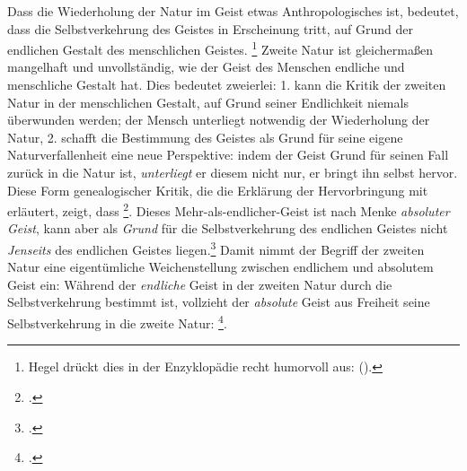 \documentclass[12pt, a4paper, openany]{report}
\begin{document}
Dass die Wiederholung der Natur im Geist etwas Anthropologisches ist, bedeutet, dass die Selbstverkehrung des Geistes in Erscheinung tritt, auf Grund der endlichen Gestalt des menschlichen Geistes.%
\footnote{
    Hegel drückt dies in der Enzyklopädie recht humorvoll aus:  (\cite[][§ 410 A, S. 186]{hegel_enzyklopädie_1969}).
}
Zweite Natur ist gleichermaßen mangelhaft und unvollständig, wie der Geist des Menschen endliche und menschliche Gestalt hat.
Dies bedeutet zweierlei: 
1. kann die Kritik der zweiten Natur in der menschlichen Gestalt, auf Grund seiner Endlichkeit niemals überwunden werden;
der Mensch unterliegt notwendig der Wiederholung der Natur,
2. schafft die Bestimmung des Geistes als Grund für seine eigene Naturverfallenheit eine neue Perspektive: 
indem der Geist Grund für seinen Fall zurück in die Natur ist, \emph{unterliegt} er diesem nicht nur, er bringt ihn selbst hervor.
Diese Form genealogischer Kritik, die die Erklärung der Hervorbringung mit erläutert, zeigt, dass \footcite[][140]{menke_autonomie_2018}.
Dieses Mehr-als-endlicher-Geist ist nach Menke \emph{absoluter Geist}, kann aber als \emph{Grund} für die Selbstverkehrung des endlichen Geistes nicht \emph{Jenseits} des endlichen Geistes liegen.\footcite[Vgl.][140]{menke_autonomie_2018}
Damit nimmt der Begriff der zweiten Natur eine eigentümliche Weichenstellung zwischen endlichem und absolutem Geist ein:
Während der \emph{endliche} Geist in der zweiten Natur durch die Selbstverkehrung bestimmt ist, vollzieht der \emph{absolute} Geist aus Freiheit seine Selbstverkehrung in die zweite Natur:
\footcite[Vgl.][140]{menke_autonomie_2018}.
\end{document}
